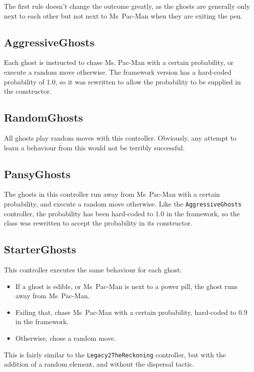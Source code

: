 The first rule doesn't change the outcome greatly, as the ghosts are generally only next to each other but not next to Ms~Pac-Man when they are exiting the pen.

\subsection{AggressiveGhosts}

Each ghost is instructed to chase Ms. Pac-Man with a certain probability, or execute a random move otherwise.  The framework version has a hard-coded probability of 1.0, so it was rewritten to allow the probability to be supplied in the constructor.

\subsection{RandomGhosts}

All ghosts play random moves with this controller.  Obviously, any attempt to learn a behaviour from this would not be terribly successful.

\subsection{PansyGhosts}

The ghosts in this controller run away from Ms~Pac-Man with a certain probability, and execute a random move otherwise.  Like the {\tt AggressiveGhosts} controller, the probability has been hard-coded to 1.0 in the framework, so the class was rewritten to accept the probability in its constructor.

\subsection{StarterGhosts}

This controller executes the same behaviour for each ghost:

\begin{itemize}
\item If a ghost is edible, or Ms~Pac-Man is next to a power pill, the ghost runs away from Ms~Pac-Man.
\item Failing that, chase Ms~Pac-Man with a certain probability, hard-coded to 0.9 in the framework.
\item Otherwise, chose a random move.
\end{itemize}

This is fairly similar to the {\tt Legacy2TheReckoning} controller, but with the addition of a random element, and without the dispersal tactic.


